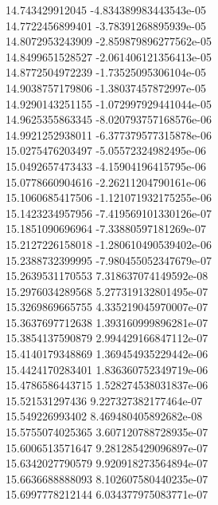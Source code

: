 {14.743429912045 -4.834389983443543e-05 \\
14.7722456899401 -3.78391268895939e-05 \\
14.8072953243909 -2.859879896277562e-05 \\
14.8499651528527 -2.061406121356413e-05 \\
14.8772504972239 -1.73525095306104e-05 \\
14.9038757179806 -1.38037457872997e-05 \\
14.9290143251155 -1.072997929441044e-05 \\
14.9625355863345 -8.020793757168576e-06 \\
14.9921252938011 -6.377379577315878e-06 \\
15.0275476203497 -5.05572324982495e-06 \\
15.0492657473433 -4.15904196415795e-06 \\
15.0778660904616 -2.26211204790161e-06 \\
15.1060685417506 -1.121071932175255e-06 \\
15.1423234957956 -7.419569101330126e-07 \\
15.1851090696964 -7.33880597181269e-07 \\
15.2127226158018 -1.280610490539402e-06 \\
15.2388732399995 -7.980455052347679e-07 \\
15.2639531170553 7.318637074149592e-08 \\
15.2976034289568 5.277319132801495e-07 \\
15.3269869665755 4.335219045970007e-07 \\
15.3637697712638 1.393160999896281e-07 \\
15.3854137590879 2.994429166847112e-07 \\
15.4140179348869 1.369454935229442e-06 \\
15.4424170283401 1.836360752349719e-06 \\
15.4786586443715 1.528274538031837e-06 \\
15.521531297436 9.227327382177464e-07 \\
15.549226993402 8.469480405892682e-08 \\
15.5755074025365 3.607120788728935e-07 \\
15.6006513571647 9.281285429096897e-07 \\
15.6342027790579 9.920918273564894e-07 \\
15.6636688888093 8.102607580440235e-07 \\
15.6997778212144 6.034377975083771e-07 \\
}
